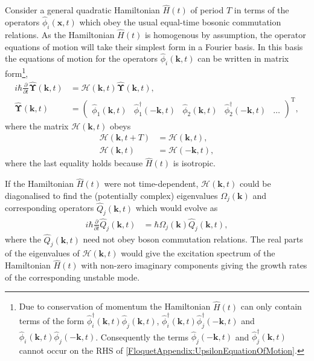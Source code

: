Consider a general quadratic Hamiltonian $\hat{H}(t)$ of period $T$ in terms of the operators $\hat{\phi}_i(\bm{x}, t)$ which obey the usual equal-time bosonic commutation relations. As the Hamiltonian $\hat{H}(t)$ is homogenous by assumption, the operator equations of motion will take their simplest form in a Fourier basis. In this basis the equations of motion for the operators $\hat{\phi}_i(\bm{k}, t)$ can be written in matrix form\footnote{Due to conservation of momentum the Hamiltonian $\hat{H}(t)$ can only contain terms of the form $\hat{\phi}_i^\dagger(\bm{k}, t) \hat{\phi}_j^{\phantom{\dagger}}(\bm{k}, t)$, $\hat{\phi}_i^\dagger(\bm{k}, t) \hat{\phi}_j^{\dagger}(-\bm{k}, t)$ and $\hat{\phi}_i^{\phantom{\dagger}}(\bm{k}, t) \hat{\phi}_j^{\phantom{\dagger}}(-\bm{k}, t)$. Consequently the terms $\hat{\phi}_j(-\bm{k}, t)$ and $\hat{\phi}_j^\dagger(\bm{k}, t)$ cannot occur on the RHS of \eqref{FloquetAppendix:UpsilonEquationOfMotion}.},
\begin{subequations}
    \label{FloquetAppendix:MatrixOperatorEvolution}
    \begin{align}
        i \hbar \frac{\partial }{\partial t}\hat{\bm{\Upsilon}}(\bm{k}, t) &= \mathcal{H}(\bm{k}, t) \hat{\bm{\Upsilon}}(\bm{k}, t), \label{FloquetAppendix:UpsilonEquationOfMotion}\\
        \hat{\bm{\Upsilon}}(\bm{k}, t) &= 
        \begin{pmatrix}
            \hat{\phi}_1^{\phantom{\dagger}}(\bm{k}, t) &
            \hat{\phi}_1^\dagger(-\bm{k}, t) &
            \hat{\phi}_2^{\phantom{\dagger}}(\bm{k}, t) &
            \hat{\phi}_2^\dagger(-\bm{k}, t) &
            \dots
        \end{pmatrix}^\text{T},
    \end{align}
\end{subequations}
where the matrix $\mathcal{H}(\bm{k}, t)$ obeys
\begin{align}
        \mathcal{H}(\bm{k}, t+T) &= \mathcal{H}(\bm{k}, t),\\
        \mathcal{H}(\bm{k}, t) &= \mathcal{H}(-\bm{k}, t), \label{FloquetAppendix:HReflectionSymmetry}
\end{align}
where the last equality holds because $\hat{H}(t)$ is isotropic.

If the Hamiltonian $\hat{H}(t)$ were not time-dependent, $\mathcal{H}(\bm{k}, t)$ could be diagonalised to find the (potentially complex) eigenvalues $\Omega_j(\bm{k})$ and corresponding operators $\hat{Q}_j(\bm{k}, t)$ which would evolve as
\begin{align}
    \label{FloquetAppendix:ContinouousTimeEigenoperators}
    i \hbar \frac{\partial }{\partial t}\hat{Q}_j(\bm{k}, t) &= \hbar \Omega_j(\bm{k}) \hat{Q}_j(\bm{k}, t),
\end{align}
where the $\hat{Q}_j(\bm{k}, t)$ need not obey boson commutation relations. The real parts of the eigenvalues of $\mathcal{H}(\bm{k}, t)$ would give the excitation spectrum of the Hamiltonian $\hat{H}(t)$ with non-zero imaginary components giving the growth rates of the corresponding unstable mode.

